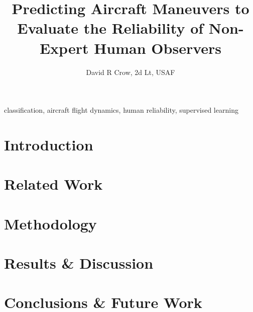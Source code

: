 \documentclass[journal, draft]{IEEEtran}
\title{Predicting Aircraft Maneuvers to Evaluate the Reliability of Non-Expert Human Observers}
\author{David R Crow, 2d Lt, USAF}
\begin{document}
\maketitle

% 

\begin{IEEEkeywords}
classification, aircraft flight dynamics, \newline human reliability, supervised learning
\end{IEEEkeywords}

\section{Introduction}\label{sec:intro}
% 

\section{Related Work}\label{sec:related}
% 

\section{Methodology}\label{sec:method}
% 

\section{Results \& Discussion}\label{sec:results}
% 

\section{Conclusions \& Future Work}\label{sec:conclusion}
% 


% 
\end{document}

